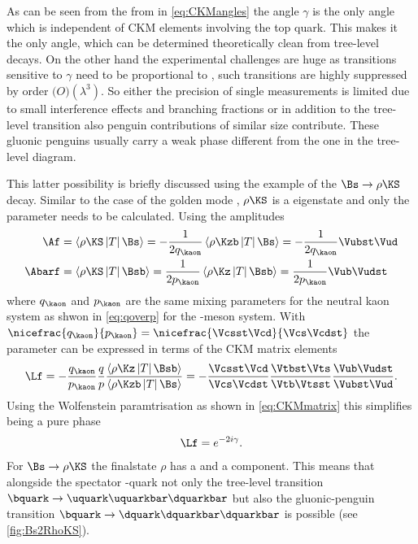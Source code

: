 As can be seen from the from in \cref{eq:CKMangles} the angle $\gamma$ is the only angle which is independent of CKM elements involving the top quark.
This makes it the only angle, which can be determined theoretically clean from tree-level decays.
On the other hand the experimental challenges are huge as transitions sensitive to $\gamma$ need to be proportional to \Vub, \ie such transitions are highly suppressed by order $\mathcal(O)\left(\lambda^3\right)$.
So either the precision of single measurements is limited due to small interference effects and branching fractions or in addition to the tree-level transition also penguin contributions of similar size contribute.
These gluonic penguins usually carry a weak phase different from the one in the tree-level diagram.

This latter possibility is briefly discussed using the example of the $\Bs\to\rho\KS$ decay.
Similar to the case of the golden mode \BdToJPsiKS, $\rho\KS$ is a \CP eigenstate and only the parameter \Lf needs to be calculated.
Using the amplitudes
\begin{equation}
\begin{aligned}
\Af&=\left<\rho\KS\left|T\right|\Bs\right>=-\frac{1}{2q_{\kaon}}\left<\rho\Kzb\left|T\right|\Bs\right>=-\frac{1}{2q_{\kaon}}\Vubst\Vud\\
\Abarf&=\left<\rho\KS\left|T\right|\Bsb\right>=\frac{1}{2p_{\kaon}}\left<\rho\Kz\left|T\right|\Bsb\right>=\frac{1}{2p_{\kaon}}\Vub\Vudst
\end{aligned}
\end{equation}
where $q_{\kaon}$ and $p_{\kaon}$ are the same mixing parameters for the neutral kaon system as shwon in \cref{eq:qoverp} for the \Bz-meson system.
With $\nicefrac{q_{\kaon}}{p_{\kaon}}=\nicefrac{\Vcsst\Vcd}{\Vcs\Vcdst}$ the parameter \Lf can be expressed in terms of the CKM matrix elements
\begin{equation}
\Lf=-\frac{q_{\kaon}}{p_{\kaon}}\frac{q}{p}\frac{\left<\rho\Kz\left|T\right|\Bsb\right>}{\left<\rho\Kzb\left|T\right|\Bs\right>}
=-\frac{\Vcsst\Vcd}{\Vcs\Vcdst}\frac{\Vtbst\Vts}{\Vtb\Vtsst}\frac{\Vub\Vudst}{\Vubst\Vud}.
\end{equation}
Using the Wolfenstein paramtrisation as shown in \cref{eq:CKMmatrix} this simplifies \Lf being a pure phase
\begin{equation}
\Lf=e^{-2i\gamma}.
\end{equation}
For $\Bs\to\rho\KS$ the finalstate $\rho$ has a \uquark\uquarkbar and a \dquark\dquarkbar component.
This means that alongside the spectator \squark-quark not only the tree-level transition $\bquark\to\uquark\uquarkbar\dquarkbar$ but also the gluonic-penguin transition $\bquark\to\dquark\dquarkbar\dquarkbar$ is possible (see \cref{fig:Bs2RhoKS}).
